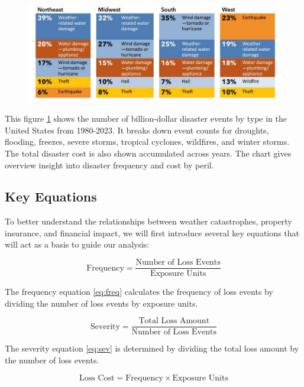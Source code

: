 \documentclass[12pt]{article}
\begin{document}
\begin{figure}[ht]
    \centering
    \includegraphics[width=0.8\linewidth]{NAIC Property Threat by Regions.pdf}
    \label{fig:regional_disasters}
    \cite{naic}
\end{figure}

This figure \ref{fig:regional_disasters} shows the number of billion-dollar disaster events by type in the United States from 1980-2023. It breaks down event counts 
for droughts, flooding, freezes, severe storms, tropical cyclones, wildfires, and winter storms. The total disaster cost is also shown 
accumulated across years. The chart gives overview insight into disaster frequency and cost by peril.
    
\subsection{Key Equations}

To better understand the relationships between weather catastrophes, property insurance, and financial impact, we will first introduce 
several key equations that will act as a basis to guide our analysis:

\begin{equation}
    \label{eq:freq}
    \text{Frequency} = \frac{\text{Number of Loss Events}}{\text{Exposure Units}}
\end{equation}

The frequency equation \ref{eq:freq} calculates the frequency of loss events by dividing the number of loss events by exposure units.

\begin{equation}
    \label{eq:sev}
    \text{Severity} = \frac{\text{Total Loss Amount}}{\text{Number of Loss Events}}
\end{equation}

The severity equation \ref{eq:sev} is determined by dividing the total loss amount by the number of loss events.

\begin{equation}
    \label{eq:losscost}
    \text{Loss Cost} = \text{Frequency} \times \text{Exposure Units}
\end{equation}
\end{document}
